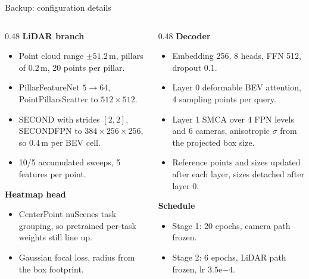 \documentclass[aspectratio=169,11pt,t]{beamer}
\begin{document}
\begin{frame}{Backup: configuration details}
  \footnotesize
  \begin{columns}[T,onlytextwidth]
    \begin{column}{0.48\textwidth}
      \textbf{LiDAR branch}
      \begin{itemize}
        \item Point cloud range $\pm 51.2$\,m, pillars of $0.2$\,m,
          20 points per pillar.
        \item PillarFeatureNet $5 \to 64$, PointPillarsScatter to
          $512 \times 512$.
        \item SECOND with strides $[2,2]$, SECONDFPN to
          $384 \times 256 \times 256$, so $0.4$\,m per BEV cell.
        \item 10/5 accumulated sweeps, 5 features per point.
      \end{itemize}
      \textbf{Heatmap head}
      \begin{itemize}
        \item CenterPoint nuScenes task grouping, so pretrained per-task
          weights still line up.
        \item Gaussian focal loss, radius from the box footprint.
      \end{itemize}
    \end{column}
    \begin{column}{0.48\textwidth}
      \textbf{Decoder}
      \begin{itemize}
        \item Embedding 256, 8 heads, FFN 512, dropout 0.1.
        \item Layer 0 deformable BEV attention, 4 sampling points per query.
        \item Layer 1 SMCA over 4 FPN levels and 6 cameras, anisotropic
          $\sigma$ from the projected box size.
        \item Reference points and sizes updated after each layer, sizes
          detached after layer 0.
      \end{itemize}
      \textbf{Schedule}
      \begin{itemize}
        \item Stage 1: 20 epochs, camera path frozen.
        \item Stage 2: 6 epochs, LiDAR path frozen, lr $3.5\mathrm{e}{-4}$.
      \end{itemize}
    \end{column}
  \end{columns}
\end{frame}
\end{document}
